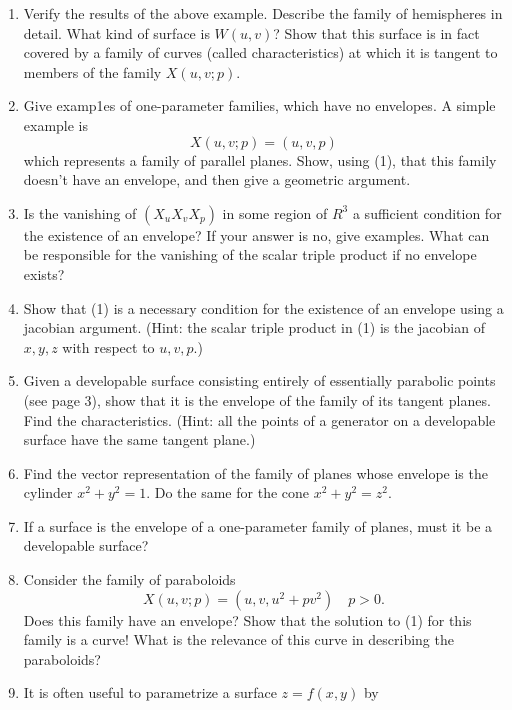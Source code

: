 \documentclass{book}
\begin{document}
\begin{enumerate}[1.]
  \item Verify the results of the above example. Describe the family of hemispheres in detail. What kind of surface is $W(u,v)$? Show that this surface is in fact covered by a family of curves (called characteristics) at which it is tangent to members of the family $X(u,v;p)$.
  \item Give examp1es of one-parameter families, which have no envelopes. A simple example is
    \begin{equation}
      X(u,v;p) = (u, v, p)
    \end{equation}
    which represents a family of parallel planes. Show, using (1), that this family doesn't have an envelope, and then give a geometric argument.
  \item Is the vanishing of $(X_{u} X_{v} X_{p})$ in some region of $R^{3}$ a sufficient condition for the existence of an envelope? If your answer is no, give examples. What can be responsible for the vanishing of the scalar triple product if no envelope exists?
  \item Show that (1) is a necessary condition for the existence of an envelope using a jacobian argument. (Hint: the scalar triple product in (1) is the jacobian of $x,y,z$ with respect to $u,v,p$.)
  \item Given a developable surface consisting entirely of essentially parabolic points (see page 3), show that it is the envelope of the family of its tangent planes. Find the characteristics. (Hint: all the points of a generator on a developable surface have the same tangent plane.)
  \item Find the vector representation of the family of planes whose envelope is the cylinder $x^{2} + y^{2} = 1$. Do the same for the cone $x^{2} + y^{2} = z^{2}$.
  \item If a surface is the envelope of a one-parameter family of planes, must it be a developable surface?
  \item Consider the family of paraboloids
      \begin{equation}
      X(u,v;p) = (u, v, u^{2} + pv^{2}) \quad p > 0.
    \end{equation}
    Does this family have an envelope? Show that the solution to (1) for this family is a curve! What is the relevance of this curve in describing the paraboloids?
  \item It is often useful to parametrize a surface $z = f(x,y)$ by
    \begin{equation}

\end{equation}
\end{enumerate}
\end{document}
